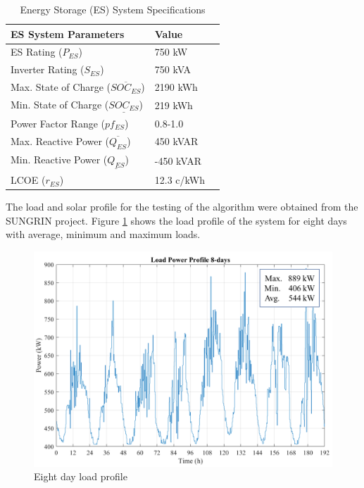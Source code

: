 \begin{table}[htb]
\normalsize
\renewcommand{\arraystretch}{1}
\caption{Energy Storage (ES) System Specifications}
\label{tab:es}
\centering
    \begin{tabular}{ | l | p{3cm} | p{3cm} | }
    \hline
    \textbf{ES System Parameters} & \textbf{Value} \\ \hline
    ES Rating (\(P_{ES}\)) & 750 kW  \\ \hline
    Inverter Rating (\(S_{ES}\)) & 750 kVA \\ \hline
    Max. State of Charge  (\(\overline{SOC_{ES}}\)) & 2190 kWh \\ \hline
    Min. State of Charge  (\(\underline{SOC_{ES}}\)) & 219 kWh \\ \hline
    Power Factor Range (\(pf_{ES}\)) & 0.8-1.0  \\ \hline
    Max. Reactive Power (\(\overline{Q_{ES}}\)) & 450 kVAR \\ \hline
    Min. Reactive Power (\(\underline{Q_{ES}}\)) & -450 kVAR \\ \hline
    LCOE (\(r_{ES}\)) & 12.3 c/kWh \\ \hline
    \end{tabular}
\end{table}

The load and solar profile for the testing of the algorithm were obtained from the SUNGRIN project. Figure \ref{fig:LOAD_PROFILE_8} shows the load profile of the system for eight days with average, minimum and maximum loads.

\begin{figure}[!ht]
    \centering
    \includegraphics[width = \linewidth]{figs/loadprofile.png}
    \caption{Eight day load profile}
    \label{fig:LOAD_PROFILE_8}
\end{figure}

